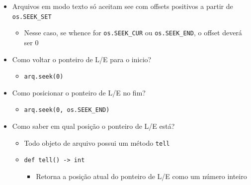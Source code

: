 \documentclass[12pt]{article}
\begin{document}
\begin{itemize}
            \item Arquivos em modo texto só aceitam see com offsets positivos 
            a partir de \verb|os.SEEK_SET|
            \begin{itemize}
                \item Nesse caso, se whence for \verb|os.SEEK_CUR| ou 
                \verb|os.SEEK_END|, o offset deverá ser 0
            \end{itemize}
            \item Como voltar o ponteiro de L/E para o inicio?
            \begin{itemize}
                \item \verb|arq.seek(0)|
            \end{itemize}
            \item Como posicionar o ponteiro de L/E no fim?
            \begin{itemize}
                \item \verb|arq.seek(0, os.SEEK_END)|
            \end{itemize}
            \item Como saber em qual posição o ponteiro de L/E está?
            \begin{itemize}
                \item Todo objeto de arquivo possui um método \verb|tell|
                \item \verb|def tell() -> int|
                \begin{itemize}
                    \item Retorna a posição atual do ponteiro de L/E como um 
                    número inteiro
                \end{itemize}
            \end{itemize} 
        \end{itemize}
\end{document}
